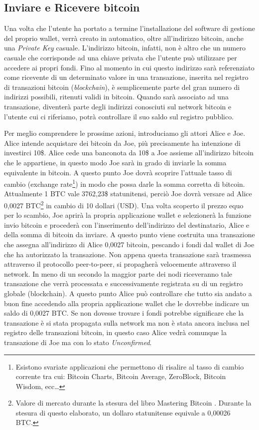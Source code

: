 \subsection*{Inviare e Ricevere bitcoin}
Una volta che l'utente ha portato a termine l'installazione del software di gestione del proprio wallet, verrà creato in automatico, oltre all'indirizzo bitcoin, anche una \textit{Private Key} casuale. L'indirizzo bitcoin, infatti, non è altro che un numero casuale che corrisponde ad una chiave privata che l'utente può utilizzare per accedere ai propri fondi. Fino al momento in cui questo indirizzo sarà referenziato come ricevente di un determinato valore in una transazione, inserita nel registro di transazioni bitcoin (\textit{blockchain}), è semplicemente parte del gran numero di indirizzi possibili, ritenuti validi in bitcoin. Quando sarà associato ad una transazione, diventerà parte degli indirizzi conosciuti sul network bitcoin e l'utente cui ci riferiamo, potrà controllare il suo saldo sul registro pubblico.

Per meglio comprendere le prossime azioni, introduciamo gli attori Alice e Joe. Alice intende acquistare dei bitcoin da Joe, più precisamente ha intenzione di investirci 10\$. Alice cede una banconota da 10\$ a Joe assieme all'indirizzo bitcoin che le appartiene, in questo modo Joe sarà in grado di inviarle la somma equivalente in bitcoin. A questo punto Joe dovrà scoprire l'attuale tasso di cambio (exchange rate\footnote{Esistono svariate applicazioni che permettono di risalire al tasso di cambio corrente tra cui: Bitcoin Charts, Bitcoin Average, ZeroBlock, Bitcoin Wisdom, ecc\dots}) in modo che possa darle la somma corretta di bitcoin. Attualmente 1 BTC vale 3762,23\$ statunitensi, perciò Joe dovrà versare ad Alice 0,0027 BTC\footnote{Valore di mercato durante la stesura del libro Mastering Bitcoin \cite{mastering:andreas}. Durante la stesura di questo elaborato, un dollaro statunitense equivale a 0,00026 BTC.} in cambio di 10 dollari (USD). Una volta scoperto il prezzo equo per lo scambio, Joe aprirà la propria applicazione wallet e selezionerà la funzione invio bitcoin e procederà con l'inserimento dell'indirizzo del destinatario, Alice e della somma di bitcoin da inviare. A questo punto viene costruita una transazione che assegna all'indirizzo di Alice 0,0027 bitcoin, pescando i fondi dal wallet di Joe che ha autorizzato la transazione. Non appena questa transazione sarà trasmessa attraverso il protocollo peer-to-peer, si propagherà velocemente attraverso il network. In meno di un secondo la maggior parte dei nodi riceveranno tale transazione che verrà processata e successivamente registrata su di un registro globale (blockchain). A questo punto Alice può controllare che tutto sia andato a buon fine accedendo alla propria applicazione wallet che le dovrebbe indicare un saldo di 0,0027 BTC. Se non dovesse trovare i fondi potrebbe significare che la transazione è si stata propagata sulla network ma non è stata ancora inclusa nel registro delle transazioni bitcoin, in questo caso Alice vedrà comunque la transazione di Joe ma con lo stato \textit{Unconfirmed}.

